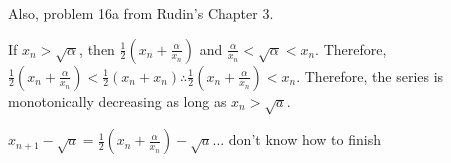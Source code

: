\documentclass[12pt]{article}
\newenvironment{exercise}[2][Exercise]{\begin{trivlist}
\item[\hskip \labelsep {\bfseries #1}\hskip \labelsep {\bfseries #2.}]}{\end{trivlist}}
\begin{document}
\begin{exercise}{2.1}
Also, problem 16a from Rudin's Chapter 3. 
\end{exercise}
If $x_n > \sqrt{\alpha}$, then $\frac{1}{2}(x_n + \frac{\alpha}{x_n})$ and $\frac{\alpha}{x_n}<\sqrt{\alpha}<x_n$. Therefore, $\frac{1}{2}(x_n + \frac{\alpha}{x_n}) < \frac{1}{2}(x_n + x_n) \therefore \frac{1}{2}(x_n + \frac{\alpha}{x_n}) < x_n$. Therefore, the series is monotonically decreasing as long as $x_n > \sqrt{a}$.

$x_{n+1} - \sqrt{a} = \frac{1}{2}(x_n + \frac{\alpha}{x_n}) - \sqrt{a}$... don't know how to finish
 
\end{document}
